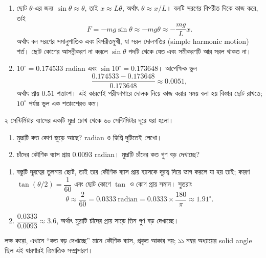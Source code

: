 \documentclass[11pt]{article}
\begin{document}
\begin{sol}
\begin{enumerate}
  \item ছোট $\theta$-এর জন্য $\sin\theta \approx \theta$, তাই
        $x \approx L\theta$, অর্থাৎ $\theta \approx x/L$। বলটি সরণের বিপরীত
        দিকে কাজ করে, তাই
        \[
          F = -mg\sin\theta \approx -mg\theta \approx -\frac{mg}{L}x .
        \]
        অর্থাৎ বল সরণের সমানুপাতিক এবং বিপরীতমুখী, যা সরল দোলগতির (simple
        harmonic motion) শর্ত। ছোট কোণের আসন্নীকরণ না করলে $\sin\theta$
        পদটি থেকে যেত এবং সমীকরণটি আর সরল থাকত না।
  \item $10^{\circ} = 0.174533$ radian এবং $\sin 10^{\circ} = 0.173648$।
        আপেক্ষিক ভুল
        \[
          \frac{0.174533 - 0.173648}{0.173648} \approx 0.0051 ,
        \]
        অর্থাৎ প্রায় $0.51$ শতাংশ। এই কারণেই পরীক্ষাগারে দোলক নিয়ে কাজ করার
        সময় বলা হয় বিস্তার ছোট রাখতে; $10^{\circ}$ পর্যন্ত ভুল এক শতাংশেরও কম।
\end{enumerate}
\end{sol}

 ২ সেন্টিমিটার ব্যাসের একটি মুদ্রা চোখ থেকে ৬০ সেন্টিমিটার দূরে ধরা
হলো।
\begin{enumerate}
  \item মুদ্রাটি কত কোণ জুড়ে আছে? radian ও ডিগ্রি দুটিতেই লেখো।
  \item চাঁদের কৌণিক ব্যাস প্রায় $0.0093$ radian। মুদ্রাটি চাঁদের কত গুণ বড়
        দেখাচ্ছে?
\end{enumerate}

\begin{sol}
\begin{enumerate}
  \item বস্তুটি দূরত্বের তুলনায় ছোট, তাই তার কৌণিক ব্যাস প্রায় ব্যাসকে
        দূরত্ব দিয়ে ভাগ করলে যা হয় তাই; কারণ
        $\tan(\theta/2) = \dfrac{1}{60}$ এবং ছোট কোণে $\tan$ ও কোণ প্রায় সমান।
        সুতরাং
        \[
          \theta \approx \frac{2}{60} = 0.0333 \ \mathrm{radian}
          = 0.0333 \times \frac{180}{\pi} \approx 1.91^{\circ} .
        \]
  \item $\dfrac{0.0333}{0.0093} \approx 3.6$, অর্থাৎ মুদ্রাটি চাঁদের প্রায়
        সাড়ে তিন গুণ বড় দেখাচ্ছে।
\end{enumerate}
লক্ষ করো, এখানে ``কত বড় দেখাচ্ছে'' মানে কৌণিক ব্যাস, প্রকৃত আকার নয়; ১১ নম্বর
অধ্যায়ের solid angle ছিল এই ধারণারই ত্রিমাত্রিক সম্প্রসারণ।
\end{sol}
\end{document}
